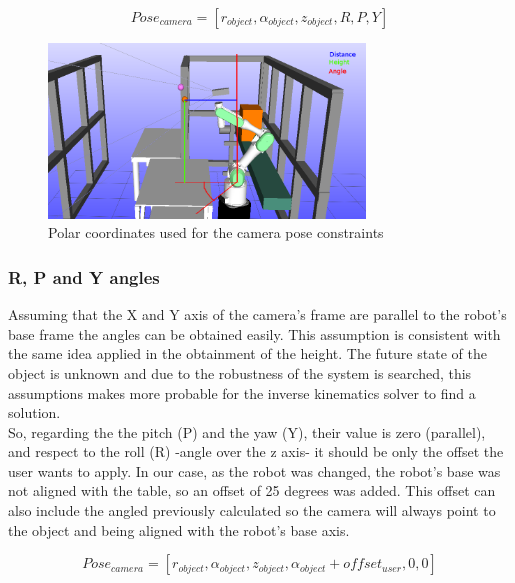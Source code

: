		\begin{equation}
			\label{eq:cameras_pose_noRPY}
			Pose_{camera} = [r_{object},\alpha_{object},z_{object},R,P,Y]
		\end{equation}
	\begin{figure}[!ht]
	 	\centering
	 	\includegraphics[width=0.75\textwidth]{figures/path_planning_constraints}
	 	\caption{Polar coordinates used for the camera pose constraints}
	 	\label{fig:path_planning_constraints}
	 \end{figure} 
	 
	\subsubsection{R, P and Y angles} %
	\label{subsub:r_p_and_y_angles}
	Assuming that the X and Y axis of the camera's frame are parallel to the robot's base frame the angles can be obtained easily.
	This assumption is consistent with the same idea applied in the obtainment of the height. 
	The future state of the object is unknown and due to the robustness of the system is searched, this assumptions makes more probable for the inverse kinematics solver to find a solution.\\


	So, regarding the the pitch (P) and the yaw (Y), their value is zero (parallel), and respect to the roll (R) -angle over the z axis- it should be only the offset the user wants to apply. 
	In our case, as the robot was changed, the robot's base was not aligned with the table, so an offset of 25 degrees was added.
	This offset can also include the angled previously calculated so the camera will always point to the object and being aligned with the robot's base axis.

		\begin{equation}
			\label{eq:cameras_pose}
			Pose_{camera} = [r_{object},\alpha_{object},z_{object},\alpha_{object}+offset_{user},0,0]
		\end{equation}

